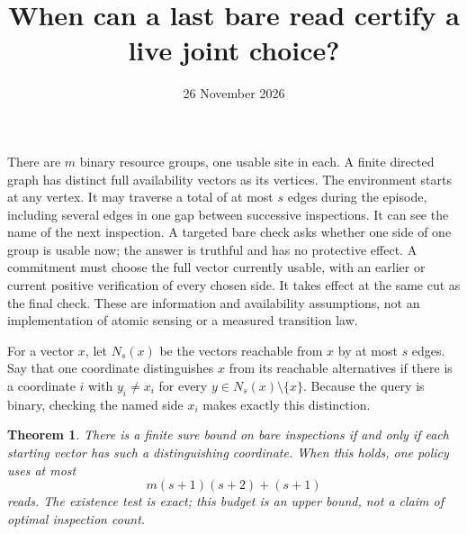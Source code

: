 \documentclass[11pt]{article}
\title{When can a last bare read certify a live joint choice?}
\author{}
\date{26 November 2026}
\newtheorem{theorem}{Theorem}
\begin{document}
\maketitle

There are $m$ binary resource groups, one usable site in each. A finite directed graph has distinct full availability vectors as its vertices. The environment starts at any vertex. It may traverse a total of at most $s$ edges during the episode, including several edges in one gap between successive inspections. It can see the name of the next inspection. A targeted bare check asks whether one side of one group is usable now; the answer is truthful and has no protective effect. A commitment must choose the full vector currently usable, with an earlier or current positive verification of every chosen side. It takes effect at the same cut as the final check. These are information and availability assumptions, not an implementation of atomic sensing or a measured transition law.

For a vector $x$, let $N_s(x)$ be the vectors reachable from $x$ by at most $s$ edges. Say that one coordinate distinguishes $x$ from its reachable alternatives if there is a coordinate $i$ with $y_i\ne x_i$ for every $y\in N_s(x)\setminus\{x\}$. Because the query is binary, checking the named side $x_i$ makes exactly this distinction.

\begin{theorem}
There is a finite sure bound on bare inspections if and only if each starting vector has such a distinguishing coordinate. When this holds, one policy uses at most
\[
 m(s+1)(s+2)+(s+1)
\]
reads. The existence test is exact; this budget is an upper bound, not a claim of optimal inspection count.
\end{theorem}
\end{document}
